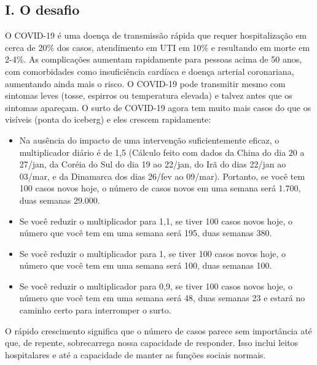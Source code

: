 \documentclass[onecolumn,journal]{IEEEtran}
\begin{document}


\begin{multicols}{2}


\section*{I. O desafio}

O COVID-19 é uma doença de transmissão rápida que requer hospitalização em cerca de 20\% dos casos, atendimento em UTI em 10\% e resultando em morte em 2-4\%. As complicações aumentam rapidamente para pessoas acima de 50 anos, com comorbidades como insuficiência cardíaca e doença arterial coronariana, aumentando ainda mais o risco.
O COVID-19 pode transmitir mesmo com sintomas leves (tosse, espirros ou temperatura elevada) e talvez antes que os sintomas apareçam.
O surto de COVID-19 agora tem muito mais casos do que os visíveis (ponta do iceberg) e eles crescem rapidamente:

\begin{itemize}
\item Na ausência do impacto de uma intervenção suficientemente eficaz, o multiplicador diário é de 1,5 (Cálculo feito com dados da China do dia 20 a 27/jan, da Coréia do Sul do dia 19 ao 22/jan, do Irã do dias 22/jan ao 03/mar, e da Dinamarca dos dias 26/fev ao 09/mar). Portanto, se você tem 100 casos novos hoje, o número de casos novos em uma semana será 1.700, duas semanas 29.000.
\item Se você reduzir o multiplicador para 1,1, se tiver 100 casos novos hoje, o número que você tem em uma semana será 195, duas semanas 380.
\item Se você reduzir o multiplicador para 1, se tiver 100 casos novos hoje, o número que você tem em uma semana será 100, duas semanas 100.
\item Se você reduzir o multiplicador para 0,9, se tiver 100 casos novos hoje, o número que você tem em uma semana será 48, duas semanas 23 e estará no caminho certo para interromper o surto.
\end{itemize}

O rápido crescimento significa que o número de casos parece sem importância até que, de repente, sobrecarrega nossa capacidade de responder. Isso inclui leitos hospitalares e até a capacidade de manter as funções sociais normais.


\end{multicols}
\end{document}
